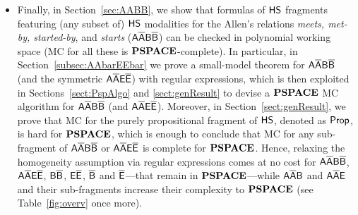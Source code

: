 \begin{itemize}
\item
Finally, in Section~\ref{sec:AABB}, we show that 
formulas of $\text{\sffamily HS}$ fragments featuring (any subset of) $\text{\sffamily HS}$ modalities for the Allen's relations \emph{meets, met-by, started-by}, and \emph{starts} ($\mathsf{A\overline{A}B\overline{B}}$) can be checked in polynomial working space (MC for all these is $\textbf{PSPACE}$-complete). 
%
In particular, in Section~\ref{subsec:AAbarEEbar} we prove a small-model 
theorem for $\mathsf{A\overline{A}B\overline{B}}$ (and the symmetric $\mathsf{A\overline{A}E\overline{E}}$) with regular 
expressions, which is then 
exploited in Sections~\ref{sect:PspAlgo} and \ref{sect:genResult} to devise a 
$\textbf{PSPACE}$ MC algorithm for $\mathsf{A\overline{A}B\overline{B}}$ (and $\mathsf{A\overline{A}E\overline{E}}$). Moreover, in 
Section~\ref{sect:genResult}, we prove that MC for the purely propositional 
fragment of $\text{\sffamily HS}$, denoted as $\mathsf{Prop}$, is hard for $\textbf{PSPACE}$, which is enough to 
conclude that MC for any sub-fragment of $\mathsf{A\overline{A}B\overline{B}}$ or $\mathsf{A\overline{A}E\overline{E}}$ is 
complete for $\textbf{PSPACE}$.
%
Hence, relaxing the homogeneity assumption via regular expressions comes at no 
cost for $\mathsf{A\overline{A}B\overline{B}}$, $\mathsf{A\overline{A}E\overline{E}}$, $\mathsf{B}\mathsf{\overline{B}}$, $\mathsf{E}\mathsf{\overline{E}}$, $\mathsf{\overline{B}}$ and 
$\mathsf{\overline{E}}$---that remain in $\textbf{PSPACE}$---while $\mathsf{A\overline{A}B}$ and $\mathsf{A}\mathsf{\overline{A}}\mathsf{E}$ and their 
sub-fragments
increase their complexity to $\textbf{PSPACE}$ (see Table~\ref{fig:overv} once more). 
\end{itemize}